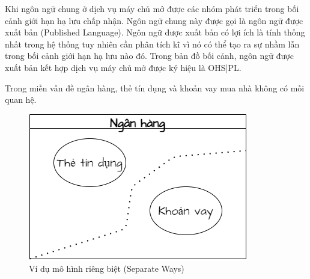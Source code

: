  
Khi   ngôn ngữ chung ở     dịch vụ máy chủ mở  được các nhóm phát triển trong     bối cảnh giới hạn  hạ lưu chấp nhận.   Ngôn ngữ chung này được gọi là  ngôn ngữ được xuất bản (Published Language). Ngôn ngữ  được xuất bản có lợi ích là tính thống nhất trong hệ thống tuy nhiên cần phân tích kĩ  vì nó có thể tạo ra  sự nhầm lẫn trong     bối cảnh giới hạn hạ lưu   nào đó.
Trong bản đồ    bối cảnh,     ngôn ngữ được xuất bản kết hợp dịch vụ máy chủ mở    được ký hiệu là     OHS|PL.
 
 
     

\begin{example} Trong miền vấn đề ngân hàng,     thẻ tín dụng và khoản vay mua nhà không có mối quan hệ. 
    
    \begin{figure}[H]
        
        \centering
        
        \includegraphics[scale = 0.5]{pictures/mo_hinh_rieng_biet_separate_ways/main.drawio.png}
        
        \caption{Ví dụ  mô hình riêng biệt (Separate Ways)  }
        
    \end{figure}
\end{example} 
